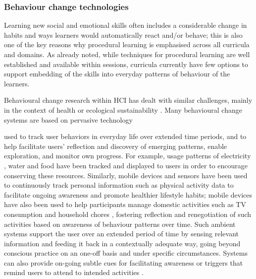 \documentclass[prodmode,acmtochi]{acmsmall}
\newcommand{\GeraldineFIX}[1]{}
\begin{document}
                \subsubsection{Behaviour change technologies}
Learning new social and emotional skills often includes a considerable change in habits and ways learners would automatically react and/or behave; this is also one of the key reasons why procedural learning is emphasised across all curricula and domains. %
As already noted, while techniques for procedural learning are well established and available within sessions, curricula currently have few options to support embedding of the skills into everyday patterns of behaviour of the learners.

        
Behavioural change research within HCI has dealt with similar challenges, mainly in the context of health or ecological sustainability \cite{Hekler2013,Consolvo2009,Klasnja2011}. %
Many behavioural change systems are based on pervasive technology 
\GeraldineFIX{G: do you really mean ambient here? should it be pervasive instead? ambient is to do with displays and how tracked info is presented? whereas we can make use of pervasively available sensors and devices to track?? }
used to track user behaviors in everyday life over extended time periods, and to help facilitate users' reflection and discovery of emerging patterns, enable exploration, and monitor own progress. For example, usage patterns of electricity \cite{Gustafsson2005}, water \cite{Kuznetsov2010} and food \cite{Ganglbauer2013} have been tracked and displayed to users in order to encourage conserving these resources.  Similarly, mobile devices and sensors have been used to continuously track personal information such as physical activity data  \cite{Lin2006a,Consolvo2008a} to facilitate ongoing awareness and promote healthier lifestyle habits; mobile devices have also been used to  help participants manage domestic activities such as TV consumption and household chores \cite{Reitberger2013}, fostering reflection and renegotiation of such activities based on awareness of behaviour patterns over time.
%
Such ambient systems support the user over an extended period of time by sensing relevant information and feeding it back in a contextually adequate way, going beyond conscious practice on an one-off basis and under specific circumstances. Systems can also provide on-going subtle cues for facilitating awareness or triggers that remind users to attend to intended activities \cite{Li2010,Consolvo2009,Obermair2008}. 
\end{document}
